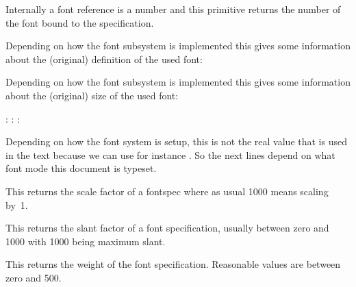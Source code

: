 \stopnewprimitive

\startnewprimitive[title={\prm {fontspecid}}]

Internally a font reference is a number and this primitive returns the number of
the font bound to the specification.

\stopnewprimitive

\startnewprimitive[title={\prm {fontspecifiedname}}]

Depending on how the font subsystem is implemented this gives some information
about the (original) definition of the used font:

\startbuffer
{\tf \fontspecifiedname\font}
{\bf \fontspecifiedname\font}
{\sl \fontspecifiedname\font}
\stopbuffer

\typebuffer

\startlines
\getbuffer
\stoplines

\stopnewprimitive

\startnewprimitive[title={\prm {fontspecifiedsize}}]

Depending on how the font subsystem is implemented this gives some information
about the (original) size of the used font:

\startbuffer
{\tf  \the\fontspecifiedsize\font : \the\glyphscale}
{\bfa \the\fontspecifiedsize\font : \the\glyphscale}
{\slx \the\fontspecifiedsize\font : \the\glyphscale}
\stopbuffer

\typebuffer

Depending on how the font system is setup, this is not the real value that is
used in the text because we can use for instance . So the next
lines depend on what font mode this document is typeset.

\startlines
\getbuffer
\stoplines

\stopnewprimitive

\startnewprimitive[title={\prm {fontspecscale}}]

This returns the scale factor of a fontspec where as usual 1000 means scaling
by~1.

\stopnewprimitive

\startnewprimitive[title={\prm {fontspecslant}}]

This returns the slant factor of a font specification, usually between zero and
1000 with 1000 being maximum slant.

\stopnewprimitive

\startnewprimitive[title={\prm {fontspecweight}}]

This returns the weight of the font specification. Reasonable values are between
zero and 500.


